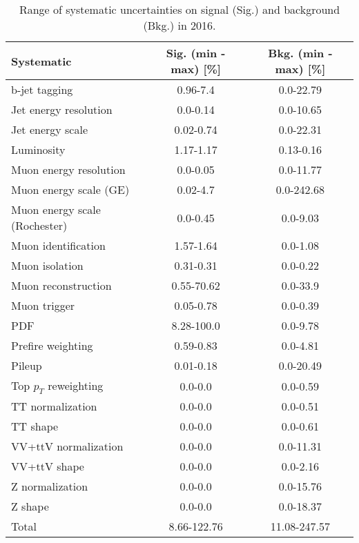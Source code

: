 \begin{table}[htbp]
\begin{center}
\caption{Range of systematic uncertainties on signal (Sig.) and background (Bkg.) in 2016.}
\begin{tabular}{lcc}
\hline\hline
Systematic					&  Sig. (min - max) [\%] &  Bkg. (min - max) [\%]  \\ \hline
b-jet tagging					& 0.96-7.4 & 0.0-22.79 \\
Jet energy resolution  		& 0.0-0.14 & 0.0-10.65 \\
Jet energy scale       		& 0.02-0.74 & 0.0-22.31 \\
Luminosity		 			& 1.17-1.17 & 0.13-0.16 \\
Muon energy resolution 		& 0.0-0.05 & 0.0-11.77 \\
Muon energy scale (GE)    	& 0.02-4.7 & 0.0-242.68 \\
Muon energy scale (Rochester)	& 0.0-0.45 & 0.0-9.03 \\
Muon identification    		& 1.57-1.64 & 0.0-1.08 \\
Muon isolation         		& 0.31-0.31 & 0.0-0.22 \\
Muon reconstruction    		& 0.55-70.62 & 0.0-33.9 \\
Muon trigger           		& 0.05-0.78 & 0.0-0.39 \\
PDF                    		& 8.28-100.0 & 0.0-9.78 \\
Prefire weighting				& 0.59-0.83 & 0.0-4.81 \\
Pileup                		& 0.01-0.18 & 0.0-20.49 \\
Top $p_T$ reweighting     	& 0.0-0.0 & 0.0-0.59 \\
TT normalization       		& 0.0-0.0 & 0.0-0.51 \\
TT shape               		& 0.0-0.0 & 0.0-0.61 \\
VV+ttV normalization          & 0.0-0.0 & 0.0-11.31 \\
VV+ttV shape          		& 0.0-0.0 & 0.0-2.16 \\
Z normalization        		& 0.0-0.0 & 0.0-15.76 \\
Z shape                		& 0.0-0.0 & 0.0-18.37 \\
Total                 		& 8.66-122.76 & 11.08-247.57 \\ \hline\hline
\end{tabular}
\label{tab:SysRanges2016}
\end{center}
\end{table}

